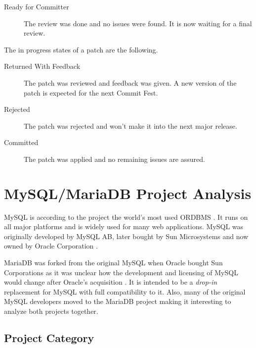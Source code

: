 \begin{description}
\begin{description}
      \item[Ready for Committer] The review was done and no issues were
        found. It is now waiting for a final review.

    \end{description}

    The in progress states of a patch are the following.

    \begin{description}

      \item[Returned With Feedback] The patch was reviewed and feedback was
        given. A new version of the patch is expected for the next Commit Fest.

      \item[Rejected] The patch was rejected and won't make it into the next
        major release.

      \item[Committed] The patch was applied and no remaining issues are
        assured.

    \end{description}

\end{description}


\section{MySQL/MariaDB Project Analysis} %


MySQL is according to the project the world's most used \ac{ORDBMS}
\cite{MySQLSun}. It runs on all major platforms and is widely used for many web
applications. MySQL was originally developed by MySQL AB, later bought by Sun
Microsystems and now owned by Oracle Corporation
\cite{MySQLSun,MySQLOracle,MySQLHistory}.

MariaDB was forked from the original MySQL when Oracle bought Sun Corporations
as it was unclear how the development and licensing of MySQL would change after
Oracle's acquisition \cite{MySQLAbout,MySQLBehind}. It is intended to be a
\emph{drop-in} replacement for MySQL with full compatibility to it. Also, many
of the original MySQL developers moved to the MariaDB project making it
interesting to analyze both projects together.

\subsection{Project Category}

